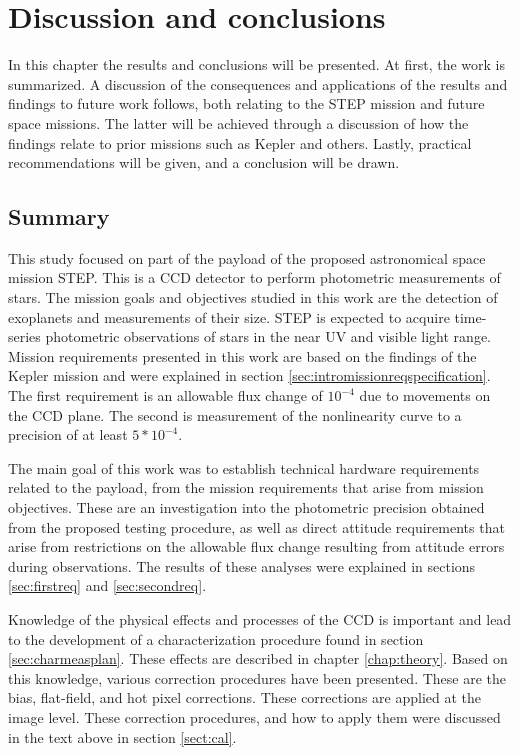 \documentclass[../main.tex]{subfiles}
\begin{document}
	
\chapter{Discussion and conclusions}
In this chapter the results and conclusions will be presented. At first, the work is summarized. A discussion of the consequences and applications of the results and findings to future work follows, both relating to the STEP mission and future space missions. The latter will be achieved through a discussion of how the findings relate to prior missions such as Kepler and others. Lastly, practical recommendations will be given, and a conclusion will be drawn.


\section{Summary}
This study focused on part of the payload of the proposed astronomical space mission STEP. This is a CCD detector to perform photometric measurements of stars. The mission goals and objectives studied in this work are the detection of exoplanets and measurements of their size. STEP is expected to acquire time-series photometric observations of stars in the near UV and visible light range. Mission requirements presented in this work are based on the findings of the Kepler mission and were explained in section \ref{sec:intromissionreqspecification}. The first requirement is an allowable flux change of $10^{-4}$ due to movements on the CCD plane. The second is measurement of the nonlinearity curve to a precision of at least $5*10^{-4}$.

The main goal of this work was to establish technical hardware requirements related to the payload, from the mission requirements that arise from mission objectives. These are an investigation into the photometric precision obtained from the proposed testing procedure, as well as direct attitude requirements that arise from restrictions on the allowable flux change resulting from attitude errors during observations. The results of these analyses were explained in sections \ref{sec:firstreq} and \ref{sec:secondreq}.

Knowledge of the physical effects and processes of the CCD is important and lead to the development of a characterization procedure found in section \ref{sec:charmeasplan}. These effects are described in chapter \ref{chap:theory}. Based on this knowledge, various correction procedures have been presented. These are the bias, flat-field, and hot pixel corrections. These corrections are applied at the image level. These correction procedures, and how to apply them were discussed in the text above in section \ref{sect:cal}. 
\end{document}
